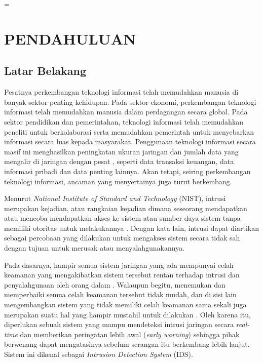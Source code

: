 \documentclass[a4paper,12pt]{report}
\begin{document}
\emergencystretch=\maxdimen
{}


\chapter{PENDAHULUAN}

\thispagestyle{empty}

\section{Latar Belakang}

Pesatnya perkembangan teknologi informasi telah memudahkan manusia di banyak sektor penting kehidupan. Pada sektor ekonomi, perkembangan teknologi informasi telah memudahkan manusia dalam perdagangan secara global. Pada sektor pendidikan dan pemerintahan, teknologi informasi telah memudahkan peneliti untuk berkolaborasi serta memudahkan pemerintah untuk menyebarkan informasi secara luas kepada masyarakat. Penggunaan teknologi informasi secara masif ini menghasilkan peningkatan ukuran jaringan dan jumlah data yang mengalir di jaringan dengan pesat \cite{ahmadNetworkIntrusionDetection2021}, seperti data transaksi keuangan, data informasi pribadi dan data penting lainnya. Akan tetapi, seiring perkembangan teknologi informasi, ancaman yang menyertainya juga turut berkembang. 

Menurut \textit{National Institute of Standard and Technology} (NIST), intrusi merupakan kejadian, atau rangkaian kejadian dimana seseorang mendapatkan atau mencoba mendapatkan akses ke sistem atau sumber daya sistem tanpa memiliki otoritas untuk melakukannya \cite{nationalinstituteofstandardstechnologyIntrusion}. Dengan kata lain, intrusi dapat diartikan sebagai percobaan yang dilakukan untuk mengakses sistem secara tidak sah dengan tujuan untuk merusak atau menyalahgunakannya. 

Pada dasarnya, hampir semua sistem jaringan yang ada mempunyai celah keamanan yang mengakibatkan sistem tersebut rentan terhadap intrusi dan penyalahgunaan oleh orang dalam \cite{luntSurveyIntrusionDetection1993}. Walaupun begitu, menemukan dan memperbaiki semua celah keamanan tersebut tidak mudah, dan di sisi lain mengembangkan sistem yang tidak memiliki celah keamanan sama sekali juga merupakan suatu hal yang hampir mustahil untuk dilakukan \cite{luntSurveyIntrusionDetection1993}\cite{denningIntrusionDetectionModel1987}. Oleh karena itu, diperlukan sebuah sistem yang mampu mendeteksi intrusi jaringan secara \textit{real-time} dan memberikan peringatan lebih awal (\textit{early warning}) sehingga pihak berwenang dapat mengatasinya sebelum serangan itu berkembang lebih lanjut. Sistem ini dikenal sebagai \textit{Intrusion Detection System} (IDS).
\end{document}
